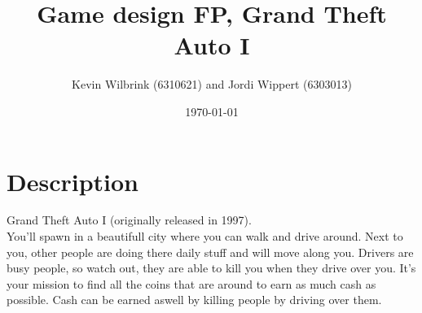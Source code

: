 \documentclass[12pt]{article}
\title{\textbf{Game design FP, Grand Theft Auto I}}
\date{\today}
\author{Kevin Wilbrink (6310621) and Jordi Wippert (6303013)}
\begin{document}
	\maketitle

	\section{Description}
	Grand Theft Auto I (originally released in 1997).\\

  You'll spawn in a beautifull city where you can walk and drive around. Next to you, other people are doing there daily stuff and will move along you. Drivers are busy people, so watch out, they are able to kill you when they drive over you. It's your mission to find all the coins that are around to earn as much cash as possible. Cash can be earned aswell by killing people by driving over them.
\end{document}

